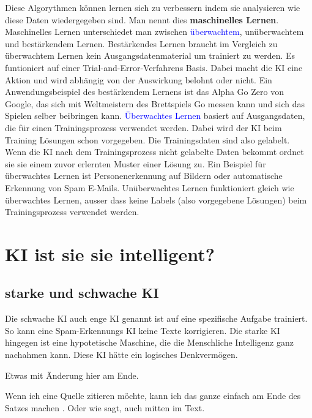 \documentclass{report}
\begin{document}
Diese Algorythmen können lernen sich zu verbessern indem sie analysieren wie diese Daten wiedergegeben sind. Man nennt dies \textbf{maschinelles Lernen}.
Maschinelles Lernen unterschiedet man zwischen \textcolor{blue}{überwachtem}, unüberwachtem und bestärkendem Lernen. Bestärkendes Lernen braucht im Vergleich zu
überwachtem Lernen kein Ausgangsdatenmaterial um trainiert zu werden. Es funtioniert auf einer Trial-and-Error-Verfahrens Basis. Dabei macht die KI
eine Aktion und wird abhängig von der Auswirkung belohnt oder nicht. Ein Anwendungsbeispiel des bestärkendem Lernens ist das Alpha Go Zero von Google, das 
sich mit Weltmeistern des Brettspiels Go messen kann und sich das Spielen selber beibringen kann.
\textcolor{blue}{Überwachtes Lernen} basiert auf Ausgangsdaten, die für einen Trainingsprozess verwendet werden.\citep{bigdatainsider} Dabei wird der KI beim Training Lösungen  
schon vorgegeben. Die Trainingsdaten sind also gelabelt. Wenn die KI nach dem Trainingsprozess nicht gelabelte Daten bekommt ordnet sie sie einem zuvor erlernten
Muster einer Lösung zu. Ein Beispiel für überwachtes Lernen ist Personenerkennung auf Bildern oder automatische Erkennung von Spam E-Mails.
Unüberwachtes Lernen funktioniert gleich wie überwachtes Lernen, ausser dass keine Labels (also vorgegebene Lösungen) beim Trainingsprozess verwendet werden.


\chapter{KI ist sie sie intelligent?}

\section{starke und schwache KI}
Die schwache KI auch enge KI genannt ist auf eine spezifische Aufgabe trainiert. So kann eine Spam-Erkennungs KI keine Texte korrigieren.
Die starke KI hingegen ist eine hypotetische Maschine, die die Menschliche Intelligenz ganz nachahmen kann. Diese KI hätte ein logisches Denkvermögen.




Etwas mit Änderung hier am Ende.

Wenn ich eine Quelle zitieren möchte, kann ich das ganze einfach am Ende des Satzes machen \citep{example}. Oder wie \citet{example} sagt, auch mitten im Text.

\printbibliography
\end{document}
